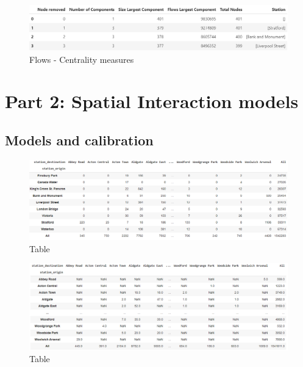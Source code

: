 \documentclass[10pt]{report}
\numberwithin{figure}{section}
\numberwithin{table}{section}
\begin{document}
    \begin{figure}[htp]
        \centering
        \includegraphics[width=14cm]{Image/Table_Flows_Betweenness.png}
        \caption{Flows - Centrality measures}
        \label{fig:galaxy}
    \end{figure}

\newpage

\section{ Part 2: Spatial Interaction models}


\subsection{Models and calibration}

    \begin{figure}[htp]
        \centering
        \includegraphics[width=14cm]{Image/Part2_OD.png}
        \caption{Table}
        \label{fig:galaxy}
    \end{figure}

    \begin{figure}[htp]
        \centering
        \includegraphics[width=14cm]{Image/Part2_OD2.png}
        \caption{Table}
        \label{fig:galaxy}
    \end{figure}
\end{document}
